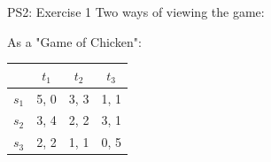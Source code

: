 \begin{frame}{PS2: Exercise 1}
Two ways of viewing the game:
\begin{multicols}{2}
  As a "Game of Chicken":
  \begin{table}
    \begin{tabular}{c|c|c|c}
            & $t_1$ & $t_2$ & $t_3$ \\
      \midrule
      $s_1$ & 5, 0  & 3, 3  & 1, 1 \\
      \midrule
      $s_2$ & 3, 4  & 2, 2  & 3, 1 \\
      \midrule
      $s_3$ & 2, 2  & 1, 1  & 0, 5
    \end{tabular}
  \end{table}
\vfill\null \columnbreak
\vfill\null
\end{multicols}
\end{frame}






